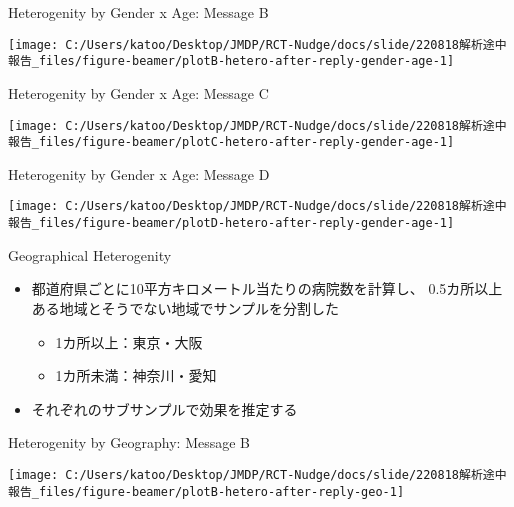 \documentclass[
      aspectratio=169,
        12pt,
    ]{beamer}
\providecommand{\tightlist}{%
  \setlength{\itemsep}{0pt}\setlength{\parskip}{0pt}}
\begin{document}
\begin{frame}{Heterogenity by Gender x Age: Message B}
\protect\hypertarget{heterogenity-by-gender-x-age-message-b}{}
\begin{center}\texttt{[image: C:/Users/katoo/Desktop/JMDP/RCT-Nudge/docs/slide/220818解析途中報告\_files/figure-beamer/plotB-hetero-after-reply-gender-age-1]} \end{center}
\end{frame}

\begin{frame}{Heterogenity by Gender x Age: Message C}
\protect\hypertarget{heterogenity-by-gender-x-age-message-c}{}
\begin{center}\texttt{[image: C:/Users/katoo/Desktop/JMDP/RCT-Nudge/docs/slide/220818解析途中報告\_files/figure-beamer/plotC-hetero-after-reply-gender-age-1]} \end{center}
\end{frame}

\begin{frame}{Heterogenity by Gender x Age: Message D}
\protect\hypertarget{heterogenity-by-gender-x-age-message-d}{}
\begin{center}\texttt{[image: C:/Users/katoo/Desktop/JMDP/RCT-Nudge/docs/slide/220818解析途中報告\_files/figure-beamer/plotD-hetero-after-reply-gender-age-1]} \end{center}
\end{frame}

\begin{frame}{Geographical Heterogenity}
\protect\hypertarget{geographical-heterogenity-1}{}
\begin{itemize}
\tightlist
\item
  都道府県ごとに10平方キロメートル当たりの病院数を計算し、
  0.5カ所以上ある地域とそうでない地域でサンプルを分割した

  \begin{itemize}
  \tightlist
  \item
    1カ所以上：東京・大阪
  \item
    1カ所未満：神奈川・愛知
  \end{itemize}
\item
  それぞれのサブサンプルで効果を推定する
\end{itemize}
\end{frame}

\begin{frame}{Heterogenity by Geography: Message B}
\protect\hypertarget{heterogenity-by-geography-message-b}{}
\begin{center}\texttt{[image: C:/Users/katoo/Desktop/JMDP/RCT-Nudge/docs/slide/220818解析途中報告\_files/figure-beamer/plotB-hetero-after-reply-geo-1]} \end{center}
\end{frame}
\end{document}
